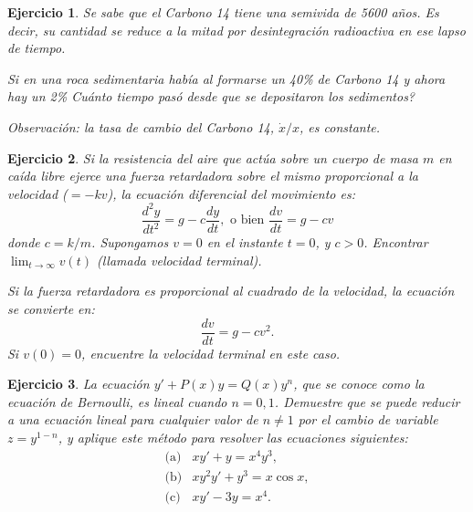 \documentclass[11pt,a4paper,pdftex]{amsart}
\newtheorem{ej}{Ejercicio}%
\numberwithin{equation}{section}%
\newcommand{\bej}[1]{\begin{ej}\rm{#1}}
\newcommand{\eej}{\end{ej}\vspace{-0.2cm}}
\newcommand{\0}{\mathbb O}
\newcommand{\8}{\infty}
\begin{document}
\bej Se sabe que el Carbono 14 tiene una semivida de 5600 años. Es decir, su cantidad
se reduce a la mitad por desintegración radioactiva en ese lapso de tiempo.

Si en una roca sedimentaria había al formarse un 40\% de Carbono 14 y ahora hay un 2\%
\textquestiondown Cuánto tiempo pasó desde que se depositaron los sedimentos?

Observación: la tasa de cambio del Carbono 14, $\dot x/x$, es constante.
\eej

\bigskip

\bej Si la resistencia del aire que act\'ua sobre un cuerpo de
masa $m$ en caída libre ejerce una fuerza retardadora sobre
el mismo proporcional a la velocidad ($=-k
v$), la ecuaci\'on diferencial del movimiento es:
\[ \frac{d^{2}y}{dt^{2}}=g -c \frac{dy}{dt}, \mbox{ o bien }
\frac{dv}{dt}= g - cv \]
donde $c=k/m$. Supongamos $v=0$ en el instante $t=0$, y $c>0$. Encontrar
$\lim _{t \rightarrow \infty} v(t)$ (llamada velocidad terminal).

Si la fuerza retardadora es proporcional al cuadrado de la
velocidad, la ecuaci\'on se convierte en:
\[ \frac{dv}{dt}=g-c v^{2}. \]
Si $v(0)=0$, encuentre la velocidad terminal en este caso.
\eej
\bigskip

\bej La ecuación $y'+P(x) y =Q(x) y^{n}$, que se conoce como la
ecuación de Bernoulli, es lineal cuando $n=0,1$. Demuestre que
se puede reducir a una ecuación lineal para cualquier valor de
$n \ne 1$ por el cambio de variable $z=y^{1-n}$, y aplique este
método para resolver las ecuaciones siguientes:
\[
\begin{array}{ll}
\mbox{(a)}&xy'+y=x^{4}y^{3},\\
\mbox{(b)}&xy^{2}y'+y^{3}=x \cos x,\\
\mbox{(c)}&x y'-3y=x^{4}.
\end{array}
\]
\eej
\end{document}
